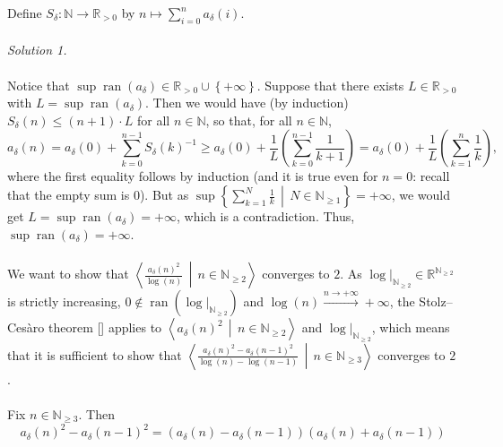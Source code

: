 \begin{solution}
    Define \( S_\delta \colon \mathbb{N} \to \mathbb{R}_{>0} \) by \( n \mapsto \sum_{i=0}^{n} a_\delta\left(i\right) \).
    \\\\
    \textit{Solution 1.}
    \\\\
    Notice that \( \sup \operatorname{ran}\left(a_\delta\right) \in \mathbb{R}_{>0} \cup \left\{+\infty\right\} \). Suppose that there exists \( L \in \mathbb{R}_{>0} \) with \( L = \sup \operatorname{ran}\left(a_\delta\right) \). Then we would have (by induction) \( S_\delta\left(n\right) \leq \left(n+1\right) \cdot L \) for all \( n \in \mathbb{N} \), so that, for all \( n \in \mathbb{N} \),
    \[
        a_\delta\left(n\right) = a_\delta\left(0\right)+\sum_{k=0}^{n-1} S_\delta\left(k\right)^{-1} \geq a_\delta\left(0\right)+\frac{1}{L}\left(\sum_{k=0}^{n-1} \frac{1}{k+1}\right) = a_\delta\left(0\right)+\frac{1}{L}\left(\sum_{k=1}^{n} \frac{1}{k}\right),
    \]
    where the first equality follows by induction (and it is true even for \( n = 0 \): recall that the empty sum is \( 0 \)). But as \( \sup\left\{ \sum_{k=1}^{N} \frac{1}{k} \,\middle|\, N \in \mathbb{N}_{\geq 1} \right\} = +\infty \), we would get \( L = \sup \operatorname{ran}\left(a_\delta\right) = +\infty \), which is a contradiction. Thus, \( \sup \operatorname{ran}\left(a_\delta\right) = +\infty \).
    \\\\
    We want to show that \( \left\langle \frac{a_\delta\left(n\right)^2}{\log\left(n\right)} \,\middle|\, n \in \mathbb{N}_{\geq 2} \right\rangle \) converges to \( 2 \). As \( \log|_{\mathbb{N}_{\geq 2}} \in \mathbb{R}^{\mathbb{N}_{\geq 2}} \) is strictly increasing, \( 0 \notin \operatorname{ran}\left(\log|_{\mathbb{N}_{\geq 2}}\right) \) and \( \log\left(n\right) \overset{n \to +\infty}{\longrightarrow} +\infty \), the Stolz–Ces\`aro theorem [] applies to \( \left\langle a_\delta\left(n\right)^2 \,\middle|\, n \in \mathbb{N}_{\geq 2} \right\rangle \) and \( \log|_{\mathbb{N}_{\geq 2}} \), which means that it is sufficient to show that \( \left\langle \frac{a_\delta\left(n\right)^2-a_\delta\left(n-1\right)^2}{\log\left(n\right)-\log\left(n-1\right)} \,\middle|\, n \in \mathbb{N}_{\geq 3} \right\rangle \) converges to \( 2 \).
    \\\\
    Fix \( n \in \mathbb{N}_{\geq 3} \). Then
    \[
        a_\delta\left(n\right)^2-a_\delta\left(n-1\right)^2 = \left(a_\delta\left(n\right)-a_\delta\left(n-1\right)\right)\left(a_\delta\left(n\right)+a_\delta\left(n-1\right)\right)
\]
\end{solution}
